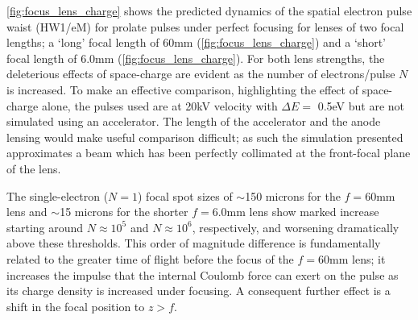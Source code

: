 \ref{fig:focus_lens_charge} shows the predicted dynamics of the spatial electron pulse waist (HW1/eM) for prolate pulses under perfect focusing for lenses of two focal lengths; a `long' focal length of 60mm (\ref{fig:focus_lens_charge}) and a `short' focal length of 6.0mm (\ref{fig:focus_lens_charge}).
For both lens strengths, the deleterious effects of space-charge are evident as the number of electrons/pulse $ N $ is increased.
To make an effective comparison, highlighting the effect of space-charge alone, the pulses used are at 20kV velocity with $\Delta E = $ 0.5eV but are not simulated using an accelerator.
The length of the accelerator and the anode lensing would make useful comparison difficult; as such the simulation presented approximates a beam which has been perfectly collimated at the front-focal plane of the lens.

The single-electron ($ N = 1 $) focal spot sizes of $\sim$150 microns for the $ f = 60 \text{mm} $ lens and $\sim$15 microns for the shorter $ f = 6.0 \text{mm} $ lens show marked increase starting around $ N \approx 10^{ 5 } $ and $ N \approx 10^{ 6 }$, respectively, and worsening dramatically above these thresholds.
This order of magnitude difference is fundamentally related to the greater time of flight before the focus of the $ f = 60\text{mm} $ lens; it increases the impulse that the internal Coulomb force can exert on the pulse as its charge density is increased under focusing.
A consequent further effect is a shift in the focal position to $ z > f $.
